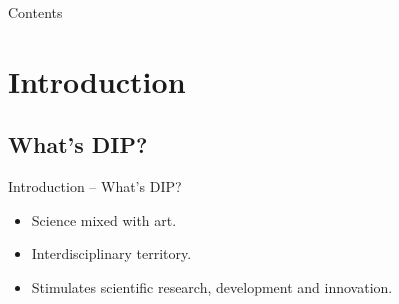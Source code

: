 


\subtitle{Introduction}





\begin{frame}
\titlepage %
\end{frame}


\begin{frame}{Contents}
\setcounter{tocdepth}{1}
\tableofcontents
\end{frame}


\section{Introduction}


\subsection{What's DIP?}


\begin{frame}{Introduction -- What's DIP?}
\begin{itemize}
\item Science mixed with art.
\item Interdisciplinary territory.
\item Stimulates scientific research, development and innovation.
\end{itemize}
\end{frame}


